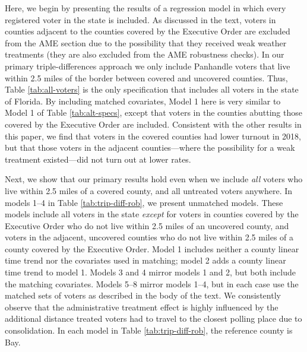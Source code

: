 \documentclass[
  12pt,
]{article}
\begin{document}
Here, we begin by presenting the results of a regression model in which every registered voter in the state is included. As discussed in the text, voters in counties adjacent to the counties covered by the Executive Order are excluded from the AME section due to the possibility that they received weak weather treatments (they are also excluded from the AME robustness checks). In our primary triple-differences approach we only include Panhandle voters that live within 2.5 miles of the border between covered and uncovered counties. Thus, Table \ref{tab:all-voters} is the only specification that includes all voters in the state of Florida. By including matched covariates, Model 1 here is very similar to Model 1 of Table \ref{tab:alt-specs}, except that voters in the counties abutting those covered by the Executive Order are included. Consistent with the other results in this paper, we find that voters in the covered counties had lower turnout in 2018, but that those voters in the adjacent counties---where the possibility for a weak treatment existed---did not turn out at lower rates.

\begin{singlespace}

\end{singlespace}

Next, we show that our primary results hold even when we include \emph{all} voters who live within 2.5 miles of a covered county, and all untreated voters anywhere. In models 1--4 in Table \ref{tab:trip-diff-rob}, we present unmatched models. These models include all voters in the state \emph{except} for voters in counties covered by the Executive Order who do not live within 2.5 miles of an uncovered county, and voters in the adjacent, uncovered counties who do not live within 2.5 miles of a county covered by the Executive Order. Model 1 includes neither a county linear time trend nor the covariates used in matching; model 2 adds a county linear time trend to model 1. Models 3 and 4 mirror models 1 and 2, but both include the matching covariates. Models 5--8 mirror models 1--4, but in each case use the matched sets of voters as described in the body of the text. We consistently observe that the administrative treatment effect is highly influenced by the additional distance treated voters had to travel to the closest polling place due to consolidation. In each model in Table \ref{tab:trip-diff-rob}, the reference county is Bay.

\begin{landscape}
\begin{singlespace}

\end{singlespace}
\end{landscape}
\end{document}
